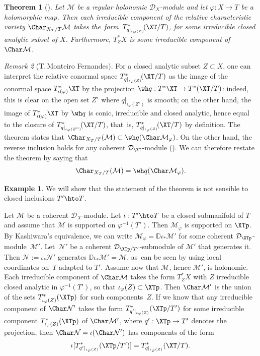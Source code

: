 \documentclass{amsart}
\theoremstyle{plain}
\newtheorem{theorem}{Theorem}
\numberwithin{theorem}{section}
\theoremstyle{definition}
\newtheorem{example}{Example}
\theoremstyle{remark}
\newtheorem{remark}[theorem]{Remark}
\theoremstyle{definition}
\newcommand{\D}{\mathbb{D}}
\newcommand{\cD}{\mathcal{D}}
\newcommand{\cM}{\mathcal{M}}
\newcommand{\cN}{\mathcal{N}}
\begin{document}
\begin{theorem}[{\cite[Th.\,3.2]{Sab2}}]\label{th:bibi86II}
Let $\cM$ be a regular holonomic $\cD_X$-module and let \hbox{$\varphi:X\!\to\! T$} be a holomorphic map. Then each irreducible component of the relative characteristic variety $\Char_{X_T/T}\cM$ takes the~form~\hbox{$T^*_{q|_{\iota_\varphi(Z)}}\!(\XT/T)$}, for some irreducible closed analytic subset of $X$. Furthermore, $T^*_ZX$ is some irreducible component of $\Char\cM$.
\end{theorem}

\begin{remark}[T.\,Monteiro Fernandes]\label{rem:Teresa}
For a closed analytic subset $Z\subset X$, one can interpret the relative conormal space $T^*_{q|_{\iota_\varphi(Z)}}\!(\XT/T)$ as the image of the conormal space $T^*_{\iota(\varphi)}\XT$ by the projection $\wh q:T^*\XT\to T^*(\XT/T)$: indeed, this is clear on the open set $Z^\circ$ where $q|_{\iota_\varphi(Z^\circ)}$ is smooth; on the other hand, the image of $T^*_{\iota(\varphi)}\XT$ by $\wh q$ is conic, irreducible and closed analytic, hence equal to the closure of $T^*_{q|_{\iota_\varphi(Z^\circ)}}\!(\XT/T)$, that~is, $T^*_{q|_{\iota_\varphi(Z)}}\!(\XT/T)$ by definition. The theorem states that $\Char_{X_T/T}(\cM)\subset\wh q(\Char\cM_\varphi)$. On the other hand, the reverse inclusion holds for any coherent $\cD_{\XT}$-module (\cf\cite[Chap.\,III, Th.\,1.3.5(d)]{Schpbook}). We can therefore restate the theorem by saying that
\[
\Char_{X_T/T}(\cM)=\wh q(\Char\cM_\varphi).
\]
\end{remark}

\begin{example}
We will show that the statement of the theorem is not sensible to closed inclusions $T'\hto T$.

Let $\cM$ be a coherent $\cD_X$-module. Let $\iota:T'\hto T$ be a closed submanifold of $T$ and assume that $\cM$ is supported on $\varphi^{-1}(T')$. Then $\cM_\varphi$ is supported on $\XTp$. By Kashiwara's equivalence, we can write $\cM_\varphi=\D\iota_*\cM'$ for some coherent $\cD_{\XTp}$\nobreakdash-mod\-ule~$\cM'$. Let~$\cN'$ be a coherent $\cD_{\XTp/T'}$-submodule of $\cM'$ that generates it. Then $\cN:=\iota_*\cN'$ generates $\D\iota_*\cM'=\cM$, as~can be seen by using local coordinates on~$T$ adapted to $T'$. Assume now that $\cM$, hence $\cM'$, is holonomic. Each irreducible component of $\Char\cM$ takes the form $T^*_ZX$ with $Z$ irreducible closed analytic in $\varphi^{-1}(T')$, so that $\iota_\varphi(Z)\subset\XTp$. Then $\Char\cM'$ is the union of the sets $T^*_{\iota_\varphi(Z)}(\XTp)$ for such components~$Z$. If we know that any irreducible component of $\Char\cN'$ takes the form $T^*_{q'|_{\iota_\varphi(Z)}}(\XTp/T')$ for some irreducible component $T^*_{\iota_\varphi(Z)}(\XTp)$ of $\Char\cM'$, where $q':\XTp\to T'$ denotes the projection, then $\Char\cN=\iota(\Char\cN')$ has components of the form
\[
\iota[T^*_{q'|_{\iota_\varphi(Z)}}(\XTp/T')]=T^*_{q|_{\iota_\varphi(Z)}}(\XT/T).
\]
\end{example}
\end{document}
